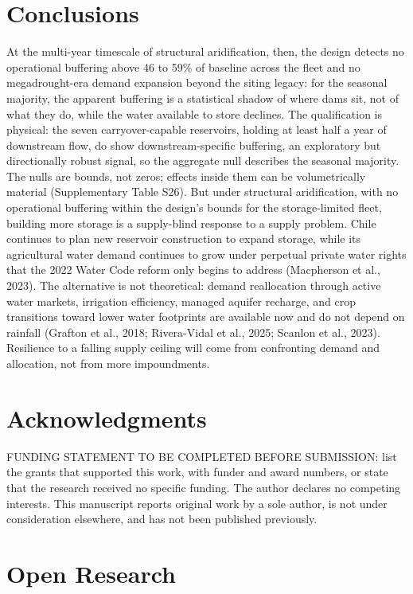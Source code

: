\documentclass[
]{agujournal2019}
\begin{document}
\section{Conclusions}\label{conclusions}

At the multi-year timescale of structural aridification, then, the
design detects no operational buffering above 46 to 59\% of baseline
across the fleet and no megadrought-era demand expansion beyond the
siting legacy: for the seasonal majority, the apparent buffering is a
statistical shadow of where dams sit, not of what they do, while the
water available to store declines. The qualification is physical: the
seven carryover-capable reservoirs, holding at least half a year of
downstream flow, do show downstream-specific buffering, an exploratory
but directionally robust signal, so the aggregate null describes the
seasonal majority. The nulls are bounds, not zeros; effects inside them
can be volumetrically material (Supplementary Table S26). But under
structural aridification, with no operational buffering within the
design's bounds for the storage-limited fleet, building more storage is
a supply-blind response to a supply problem. Chile continues to plan new
reservoir construction to expand storage, while its agricultural water
demand continues to grow under perpetual private water rights that the
2022 Water Code reform only begins to address (Macpherson et al., 2023).
The alternative is not theoretical: demand reallocation through active
water markets, irrigation efficiency, managed aquifer recharge, and crop
transitions toward lower water footprints are available now and do not
depend on rainfall (Grafton et al., 2018; Rivera-Vidal et al., 2025;
Scanlon et al., 2023). Resilience to a falling supply ceiling will come
from confronting demand and allocation, not from more impoundments.

\section*{Acknowledgments}\label{acknowledgments}

FUNDING STATEMENT TO BE COMPLETED BEFORE SUBMISSION: list the grants
that supported this work, with funder and award numbers, or state that
the research received no specific funding. The author declares no
competing interests. This manuscript reports original work by a sole
author, is not under consideration elsewhere, and has not been published
previously.

\section*{Open Research}\label{open-research}
\end{document}
